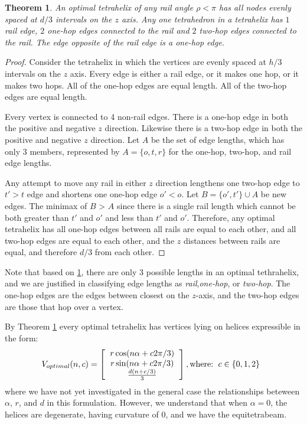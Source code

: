 \documentclass[11pt]{article}
\newtheorem{theorem}{Theorem}
\begin{document}
\begin{theorem}
  \label{eventhirds}
  An optimal tetrahelix of any rail angle $\rho < \pi$ has all nodes evenly spaced at $d/3$ intervals on the $z$ axis.
  Any one tetrahedron in a tetrahelix has $1$ rail edge, $2$ one-hop edges connected to the rail and $2$ two-hop edges connected to the rail.
  The edge opposite of the rail edge is a one-hop edge.
\end{theorem}

\begin{proof}
    Consider the tetrahelix in which the vertices are evenly spaced at
    $h/3$ intervals on the $z$ axis. Every edge is either a rail edge,
    or it makes one hop, or it makes two hops. All of the one-hop
    edges are equal length.  All of the two-hop edges are equal
    length.

    Every vertex is connected to 4 non-rail edges. There is a one-hop edge
    in both the positive and negative $z$ direction. Likewise there is a two-hop
    edge in both the positive and negative $z$ direction. Let $A$ be the set
    of edge lengths, which has only 3 members, represented by $A = \{o,t,r\}$ for
    the one-hop, two-hop, and rail edge lengths.

    Any attempt to move any rail in either $z$ direction lengthens one two-hop edge to $t' > t$
    edge and shortens one one-hop edge $o' < o$. Let $B = \{o',t' \} \cup A$ be new edges.
    The minimax of $B$ > $A$ since there is a single rail length which cannot be both greater
    than $t'$ and $o'$ and less than $t'$ and $o'$.
    Therefore, any optimal tetrahelix has all one-hop edges between all rails are equal to each other, and
    all two-hop edges are equal to each other, and the $z$ distances between rails are equal, and therefore
    $d/3$ from each other.
\end{proof}

 Note that based on \ref{eventhirds}, there are only 3 possible lengths in an optimal tethrahelix,
 and we are justified in classifying edge lengths as \emph{rail},\emph{one-hop}, or
\emph{two-hop}. The one-hop edges are the edges between closest on the $z$-axis, and the two-hop edges are those that hop over a vertex.

By Theorem \ref{eventhirds} every optimal tetrahelix has vertices lying on helices expressible in the form:
\[
V_{optimal}(n,c) =
\left [
  \begin{tabular}{c}
   $ r \cos(n \alpha +  c 2 \pi /3)$\\
   $ r \sin(n \alpha +  c 2 \pi /3) $\\
   $ \frac{d(n +c / 3)}{3}   $
  \end{tabular}
  \right ],
\text{where:}
\begin{tabular}{c}
  $c \in \{0,1,2\}$
  \end{tabular}      
\]
where we have not yet investigated in the general case the relationships beteween $\alpha$, $r$, and $d$ in this formulation.
However, we understand that when $\alpha = 0$, the helices are degenerate, having curvature of $0$, and
we have the equitetrabeam.
\end{document}
